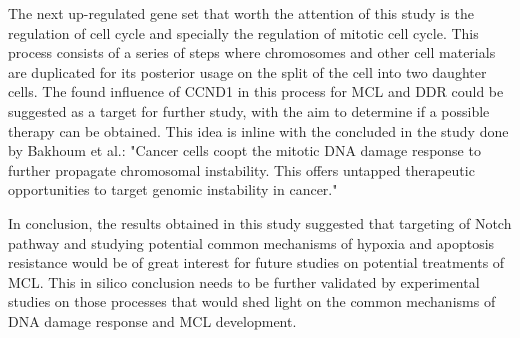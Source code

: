 The next up-regulated gene set that worth the attention of this study is the regulation of cell cycle and specially the regulation of mitotic cell cycle. This process consists of a series of steps where chromosomes and other cell materials are duplicated for its posterior usage on the split of the cell into two daughter cells.
The found influence of CCND1 in this process for MCL and DDR could be suggested as a target for further study, with the aim to determine if a possible therapy can be obtained. This idea is inline with the concluded in the study done by Bakhoum et al.: "Cancer cells coopt the mitotic DNA damage response to further propagate chromosomal instability. This offers untapped therapeutic opportunities to target genomic instability in cancer."\cite{Bakhoum2017}

In conclusion, the results obtained in this study suggested that targeting of Notch pathway and studying potential common mechanisms of hypoxia and apoptosis resistance would be of great interest for future studies on potential treatments of MCL.
This in silico conclusion needs to be further validated by experimental studies on those processes that would shed light on the common mechanisms of DNA damage response and MCL development.
